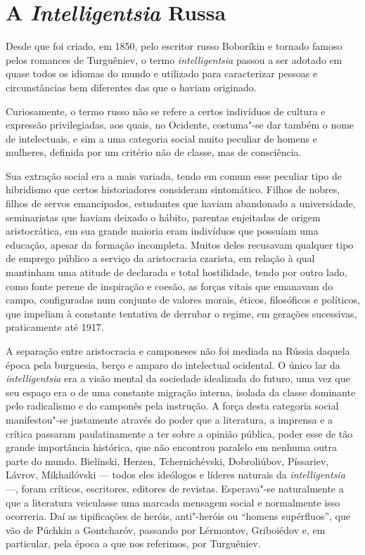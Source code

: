 \section{A \emph{Intelligentsia} Russa}

Desde que foi criado, em 1850, pelo escritor russo Boboríkin e tornado
famoso pelos romances de Turguêniev, o termo \emph{intelligentsia}
passou a ser adotado em quase todos os idiomas do mundo e utilizado para
caracterizar pessoas e circunstâncias bem diferentes das que o haviam
originado.

Curiosamente, o termo russo não se refere a certos indivíduos de cultura
e expressão privilegiadas, aos quais, no Ocidente, costuma"-se dar também
o nome de intelectuais, e sim a uma categoria social muito peculiar de
homens e mulheres, definida por um critério não de classe, mas de
consciência.

Sua extração social era a mais variada, tendo em comum esse peculiar
tipo de hibridismo que certos historiadores consideram sintomático.
Filhos de nobres, filhos de servos emancipados, estudantes que haviam
abandonado a universidade, seminaristas que haviam deixado o hábito,
parentas enjeitadas de origem aristocrática, em sua grande maioria eram
indivíduos que possuíam uma educação, apesar da formação incompleta.
Muitos deles recusavam qualquer tipo de emprego público a serviço da
aristocracia czarista, em relação à qual mantinham uma atitude de
declarada e total hostilidade, tendo por outro lado, como fonte perene
de inspiração e coesão, as forças vitais que emanavam do campo,
configuradas num conjunto de valores morais, éticos, filosóficos e
políticos, que impeliam à constante tentativa de derrubar o regime, em
gerações sucessivas, praticamente até 1917.

A separação entre aristocracia e camponeses não foi mediada na Rússia
daquela época pela burguesia, berço e amparo do intelectual ocidental. O
único lar da \emph{intelligentsia} era a visão mental da sociedade
idealizada do futuro, uma vez que seu espaço era o de uma constante
migração interna, isolada da classe dominante pelo radicalismo e do
camponês pela instrução. A força desta categoria social manifestou"-se
justamente através do poder que a literatura, a imprensa e a crítica
passaram paulatinamente a ter sobre a opinião pública, poder esse de tão
grande importância histórica, que não encontrou paralelo em nenhuma
outra parte do mundo. Bielínski, Herzen, Tchernichévski, Dobroliúbov,
Píssariev, Lávrov, Mikhailóvski --- todos eles ideólogos e líderes
naturais da \emph{intelligentsia} ---, foram críticos, escritores,
editores de revistas. Esperava"-se naturalmente a que a literatura
veiculasse uma marcada mensagem social e normalmente isso ocorreria. Daí as
tipificações de heróis, anti"-heróis ou ``homens supérfluos'', que vão de
Púchkin a Gontcharóv, passando por Lérmontov, Griboiédov e, em
particular, pela época a que nos referimos, por Turguêniev.

